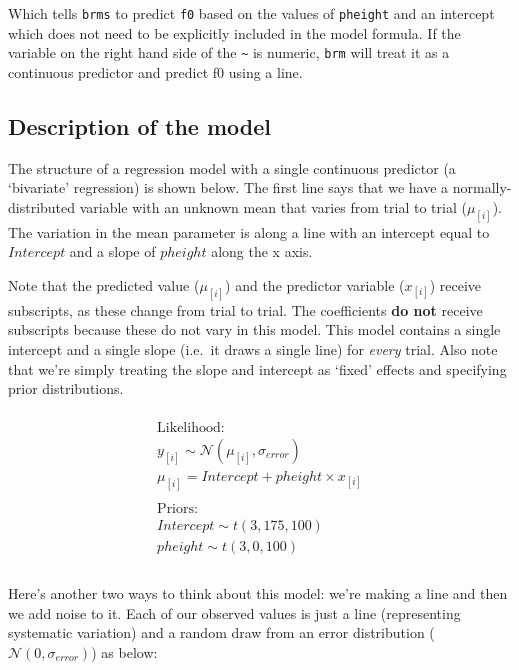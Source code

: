 \documentclass[
]{book}
\begin{document}
Which tells \texttt{brms} to predict \texttt{f0} based on the values of \texttt{pheight} and an intercept which does not need to be explicitly included in the model formula. If the variable on the right hand side of the \texttt{\textasciitilde{}} is numeric, \texttt{brm} will treat it as a continuous predictor and predict f0 using a line.

\hypertarget{description-of-the-model-4}{%
\subsection{Description of the model}\label{description-of-the-model-4}}

The structure of a regression model with a single continuous predictor (a `bivariate' regression) is shown below. The first line says that we have a normally-distributed variable with an unknown mean that varies from trial to trial (\(\mu_{[i]}\)). The variation in the mean parameter is along a line with an intercept equal to \(Intercept\) and a slope of \(pheight\) along the x axis.

Note that the predicted value (\(\mu_{[i]}\)) and the predictor variable (\(x_{[i]}\)) receive subscripts, as these change from trial to trial. The coefficients \textbf{do not} receive subscripts because these do not vary in this model. This model contains a single intercept and a single slope (i.e.~it draws a single line) for \emph{every} trial. Also note that we're simply treating the slope and intercept as `fixed' effects and specifying prior distributions.

\begin{equation}
\begin{split}
\\
\textrm{Likelihood:} \\
y_{[i]} \sim \mathcal{N}(\mu_{[i]},\sigma_{error}) \\
\mu_{[i]} = Intercept + pheight \times x_{[i]}  \\ \\
\textrm{Priors:} \\
Intercept \sim t(3, 175, 100) \\
pheight \sim t(3, 0, 100) \\
\\
\end{split}
\label{eq:57}
\end{equation}

Here's another two ways to think about this model: we're making a line and then we add noise to it. Each of our observed values is just a line (representing systematic variation) and a random draw from an error distribution (\(\mathcal{N}(0,\sigma_{error})\)) as below:
\end{document}
